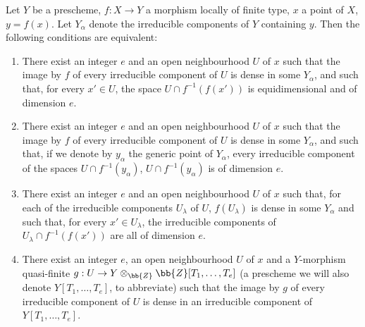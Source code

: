\begin{proposition}[13.3.1]
\label{IV.13.3.1}
Let $Y$ be a prescheme, $f:X\to Y$ a morphism locally of finite type, $x$ a point of $X$, $y=f(x)$.
Let $Y_\alpha$ denote the irreducible components of $Y$ containing $y$.
Then the following conditions are equivalent:
\begin{enumerate}[label=\emph{\alph*)}]
  \item There exist an integer $e$ and an open neighbourhood $U$ of $x$ such that the image by $f$ of every irreducible component of $U$ is dense in some $Y_\alpha$, and such that, for every $x'\in U$, the space $U\cap f^{-1}(f(x'))$ is equidimensional and of dimension $e$.
  \item[\emph{a$'$)}] There exist an integer $e$ and an open neighbourhood $U$ of $x$ such that the image by $f$ of every irreducible component of $U$ is dense in some $Y_\alpha$, and such that, if we denote by $y_\alpha$ the generic point of $Y_\alpha$, every irreducible component of the spaces $U\cap f^{-1}(y_\alpha)$, $U\cap f^{-1}(y_\alpha)$ is of dimension $e$.
  \item[\emph{a$''$)}] There exist an integer $e$ and an open neighbourhood $U$ of $x$ such that, for each of the irreducible components $U_\lambda$ of $U$, $f(U_\lambda)$ is dense in some $Y_\alpha$ and such that, for every $x'\in U_\lambda$, the irreducible components of $U_\lambda\cap f^{-1}(f(x'))$ are all of dimension $e$.
  \item There exist an integer $e$, an open neighbourhood $U$ of $x$ and a $Y$-morphism quasi-finite $g:U\to Y\otimes_{\bb{Z}}\bb{Z}[T_1,\ldots,T_e]$ (a prescheme we will also denote $Y[T_1,\ldots,T_e]$, to abbreviate) such that the image by $g$ of every irreducible component of $U$ is dense in an irreducible component of $Y[T_1,\ldots,T_e]$.
\end{enumerate}
\end{proposition}

